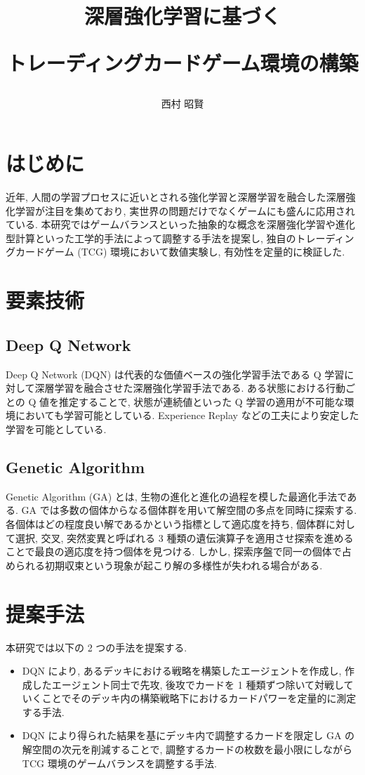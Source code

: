 \documentclass[a4paper,twoside,twocolumn,10pt]{article}
\title{深層強化学習に基づく
\par
トレーディングカードゲーム環境の構築}
\author{西村 昭賢}
\begin{document}
\maketitle %
\small

\section{はじめに}
近年, 人間の学習プロセスに近いとされる強化学習と深層学習を融合した深層強化学習が注目を集めており, 実世界の問題だけでなくゲームにも盛んに応用されている.
本研究ではゲームバランスといった抽象的な概念を深層強化学習や進化型計算といった工学的手法によって調整する手法を提案し, 独自のトレーディングカードゲーム (TCG) 環境において数値実験し, 有効性を定量的に検証した.

\section{要素技術}
\subsection{Deep Q Network}
Deep Q Network (DQN) \cite{DQN} は代表的な価値ベースの強化学習手法である Q 学習に対して深層学習を融合させた深層強化学習手法である.
ある状態における行動ごとの Q 値を推定することで, 状態が連続値といった Q 学習の適用が不可能な環境においても学習可能としている. Experience Replay などの工夫により安定した学習を可能としている.

\subsection{Genetic Algorithm}
Genetic Algorithm (GA) とは, 生物の進化と進化の過程を模した最適化手法である. GA では多数の個体からなる個体群を用いて解空間の多点を同時に探索する. 各個体はどの程度良い解であるかという指標として適応度を持ち, 個体群に対して選択, 交叉, 突然変異と呼ばれる 3 種類の遺伝演算子を適用させ探索を進めることで最良の適応度を持つ個体を見つける. しかし, 探索序盤で同一の個体で占められる初期収束という現象が起こり解の多様性が失われる場合がある.

\section{提案手法}
本研究では以下の 2 つの手法を提案する.
\begin{itemize}
  \item DQN により, あるデッキにおける戦略を構築したエージェントを作成し, 作成したエージェント同士で先攻, 後攻でカードを 1 種類ずつ除いて対戦していくことでそのデッキ内の構築戦略下におけるカードパワーを定量的に測定する手法.
  \item DQN により得られた結果を基にデッキ内で調整するカードを限定し GA の解空間の次元を削減することで, 調整するカードの枚数を最小限にしながら TCG 環境のゲームバランスを調整する手法.
\end{itemize}
\end{document}
